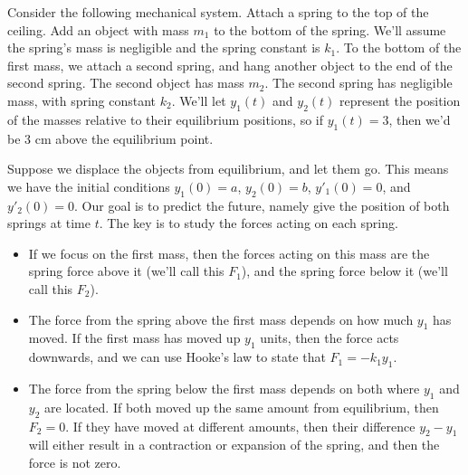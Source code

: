 \begin{problem}
Consider the following mechanical system.  Attach a spring to the top of the ceiling. Add an object with mass $m_1$ to the bottom of the spring. We'll assume the spring's mass is negligible and the spring constant is $k_1$.
To the bottom of the first mass, we attach a second spring, and hang another object to the end of the second spring.  The second object has mass $m_2$. The second spring has negligible mass, with spring constant $k_2$.
We'll let $y_1(t)$ and $y_2(t)$ represent the position of the masses relative to their equilibrium positions, so if $y_1(t)=3$, then we'd be 3 cm above the equilibrium point. 

Suppose we displace the objects from equilibrium, and let them go. This means we have the initial conditions $y_1(0)=a$, $y_2(0)=b$, $y'_1(0)=0$, and $y'_2(0)=0$. Our goal is to predict the future, namely give the position of both springs at time $t$. 
The key is to study the forces acting on each spring.
\begin{itemize}
 \item If we focus on the first mass, then the forces acting on this mass are the spring force above it (we'll call this $F_1$), and the spring force below it (we'll call this $F_2$). 
 \item The force from the spring above the first mass depends on how much $y_1$ has moved.  If the first mass has moved up $y_1$ units, then the force acts downwards, and we can use Hooke's law to state that $F_1=-k_1 y_1$. 
 \item The force from the spring below the first mass depends on both where $y_1$ and $y_2$ are located. If both moved up the same amount from equilibrium, then $F_2=0$. If they have moved at different amounts, then their difference $y_2-y_1$ will either result in a contraction or expansion of the spring, and then the force is not zero. 
\end{itemize}



\end{problem}
